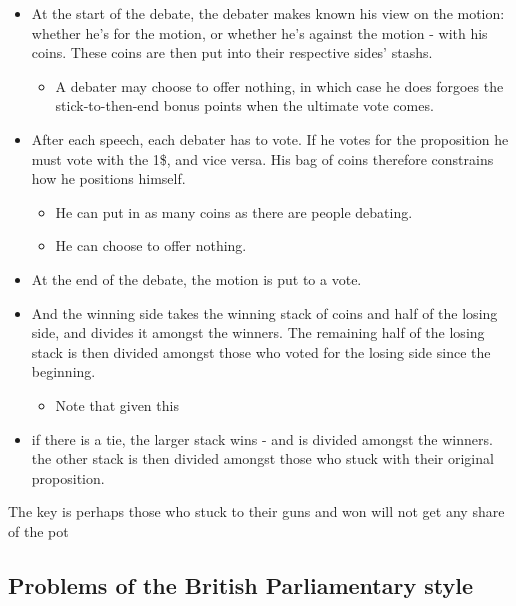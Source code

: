 \begin{itemize}
    \item At the start of the debate, the debater makes known his view on the motion: whether he's for the motion, or whether he's against the motion - with his coins. These coins are then put into their respective sides' stashs.
    \begin{itemize}
        \item A debater may choose to offer nothing, in which case he does forgoes the stick-to-then-end bonus points when the ultimate vote comes.
    \end{itemize}
    \item After each speech, each debater has to vote. If he votes for the proposition he must vote with the 1\$, and vice versa. His bag of coins therefore constrains how he positions himself.
    \begin{itemize}
        \item He can put in as many coins as there are people debating.
        \item He can choose to offer nothing.
    \end{itemize}
    \item At the end of the debate, the motion is put to a vote.
    \item And the winning side takes the winning stack of coins and half of the losing side, and divides it amongst the winners. The remaining half of the losing stack is then divided amongst those who voted for the losing side since the beginning.
    \begin{itemize}
        \item Note that given this
    \end{itemize}
    \item if there is a tie, the larger stack wins - and is divided amongst the winners. the other stack is then divided amongst those who stuck with their original proposition.
\end{itemize}

The key is perhaps those who stuck to their guns and won will not get any share of the pot


\subsection{Problems of the British Parliamentary style}

